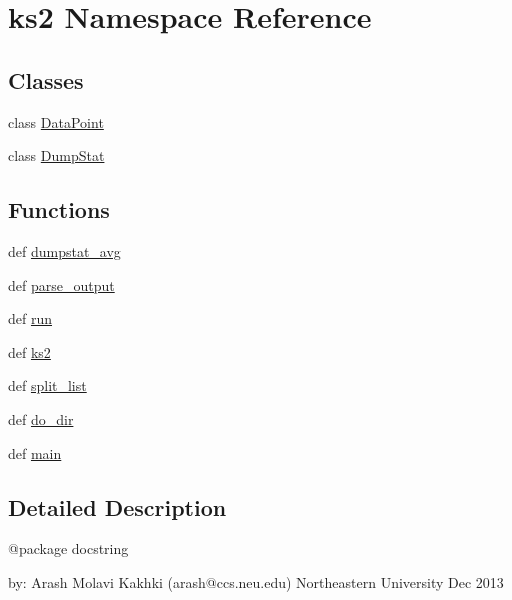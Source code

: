 \hypertarget{namespaceks2}{\section{ks2 Namespace Reference}
\label{namespaceks2}
}
\subsection*{Classes}
\begin{DoxyCompactItemize}
\item 
class \hyperlink{classks2_1_1_data_point}{Data\-Point}
\item 
class \hyperlink{classks2_1_1_dump_stat}{Dump\-Stat}
\end{DoxyCompactItemize}
\subsection*{Functions}
\begin{DoxyCompactItemize}
\item 
def \hyperlink{namespaceks2_a1f5bd5926d5beaa05f2964aa775914ff}{dumpstat\-\_\-avg}
\item 
def \hyperlink{namespaceks2_af9985767855e318b87d6d0a98e2598eb}{parse\-\_\-output}
\item 
def \hyperlink{namespaceks2_ae5fb7c0285ff12ec949e4f53d130f545}{run}
\item 
def \hyperlink{namespaceks2_af15630b152fbabcd3c5ea630557f64ae}{ks2}
\item 
def \hyperlink{namespaceks2_a5bedfd66ee1f9bf5e0f049208dd811fc}{split\-\_\-list}
\item 
def \hyperlink{namespaceks2_aec9fba868fd56ed1eae5920b4e8a15e0}{do\-\_\-dir}
\item 
def \hyperlink{namespaceks2_a6ad8dc5a3671d9ceb545b4d568683ffc}{main}
\end{DoxyCompactItemize}


\subsection{Detailed Description}
\begin{DoxyVerb}@package docstring

by: Arash Molavi Kakhki (arash@ccs.neu.edu)
    Northeastern University
    Dec 2013\end{DoxyVerb}
 

